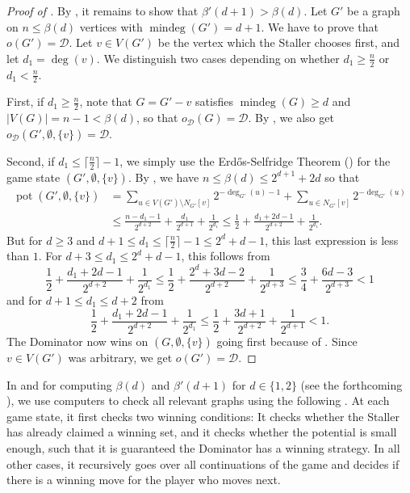 \documentclass[a4paper,11pt,oneside]{scrartcl}
\theoremstyle{definition}
\theoremstyle{remark}
\DeclareMathOperator{\mindeg}{mindeg}
\DeclareMathOperator{\pot}{pot}
\begin{document}
\begin{proof}[Proof of ]
    By , it remains to show that $\beta'(d+1) > \beta(d)$. Let $G'$ be a graph on $n\leq \beta(d)$ vertices with $\mindeg(G')=d+1$.
    We have to prove that $o(G') = \mathcal D$. 
    Let $v \in V(G')$ be the vertex which the Staller chooses first, and let $d_1=\deg(v)$.
    We distinguish two cases depending on whether $d_1 \geq \frac n2$ or $d_1 < \frac n2$.
    
    First, if $d_1 \geq \frac n2$, note that $G = G'-v$ satisfies $\mindeg(G)\geq d$ and $|V(G)| = n-1 < \beta(d)$, so that $o_{\mathcal D}(G) = \mathcal D$.
    By , we also get $o_{\mathcal D}(G', \emptyset, \{v\}) = \mathcal D$.
    
    Second, if $d_1 \leq \lceil \frac n2 \rceil -1$, we simply use the Erd\H{o}s-Selfridge Theorem () for the game state $(G', \emptyset, \{v\})$. By , we have $n\leq \beta(d) \leq 2^{d+1}+2d$ so that
    \begin{align*}
        \pot(G',\emptyset,\{v\})&=\sum_{u\in V(G')\setminus N_{G'}[v]} 2^{-\deg_{G'}(u)-1}+\sum_{u\in N_{G'}[v]} 2^{-\deg_{G'}(u)}\\
        &\leq \frac{n-d_1-1}{2^{d+2}}+ \frac{d_1}{2^{d+1}} + \frac1{2^{d_1}} \leq \frac12 + \frac{d_1+2d-1}{2^{d+2}} + \frac1{2^{d_1}}.
    \end{align*}
    But for $d \geq 3$ and $d+1 \leq d_1 \leq \lceil \frac n2 \rceil -1 \leq 2^d+d-1$, this last expression is less than $1$. For $d+3 \leq d_1 \leq 2^d+d-1$, this follows from 
    \[
        \frac12 + \frac{d_1+2d-1}{2^{d+2}} + \frac1{2^{d_1}} \leq \frac12 + \frac{2^d+3d-2}{2^{d+2}} + \frac1{2^{d+3}}\leq  \frac34 + \frac{6d-3}{2^{d+3}} <1
    \]
    and for $d+ 1 \leq d_1 \leq d+2$ from 
    \[
        \frac12 + \frac{d_1+2d-1}{2^{d+2}} + \frac1{2^{d_1}} \leq \frac12 + \frac{3d+1}{2^{d+2}} + \frac1{2^{d+1}}<1.
    \]
    The Dominator now wins on $(G,\emptyset, \{v\})$ going first because of . Since $v \in V(G')$ was arbitrary, we get $o(G') = \mathcal D$.
\end{proof}

In  and for computing $\beta(d)$ and $\beta'(d+1)$ for $d \in \{1,2\}$ (see the forthcoming ), we use computers to check all relevant graphs using the following . At each game state, it first checks two winning conditions: It checks whether the Staller has already claimed a winning set, and it checks whether the potential is small enough, such that it is guaranteed the Dominator has a winning strategy. In all other cases, it recursively goes over all continuations of the game and decides if there is a winning move for the player who moves next.
\end{document}

